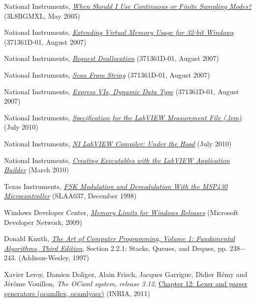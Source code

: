 \documentclass[a4paper]{report}
\begin{document}
\begin{thebibliography}{99}
National Instruments, {\it \href{http://digital.ni.com/public.nsf/allkb/B86AA2D2FDE9A16086256FFC00604202}{When Should I Use Continuous or Finite Sampling Modes?}} (3L8BGMXL, May 2005)

National Instruments, {\it \href{http://zone.ni.com/reference/en-XX/help/371361D-01/lvhowto/enable_lrg_ad_aware/}{Extending Virtual Memory Usage for 32-bit Windows}} (371361D-01, August 2007)

National Instruments, {\it \href{http://zone.ni.com/reference/en-XX/help/371361D-01/glang/request_dealloc/}{Request Deallocation}} (371361D-01, August 2007)

National Instruments, {\it \href{http://zone.ni.com/reference/en-XX/help/371361D-01/glang/scan_from_string/}{Scan From String}} (371361D-01, August 2007)

National Instruments, {\it \href{http://zone.ni.com/reference/en-XX/help/371361D-01/lvconcepts/expressvis/}{Express VIs, Dynamic Data Type}} (371361D-01, August 2007)

National Instruments, {\it \href{http://zone.ni.com/devzone/cda/tut/p/id/4139}{Specification for the LabVIEW Measurement File (.lvm)}} (July 2010)

National Instruments, {\it \href{http://zone.ni.com/devzone/cda/tut/p/id/11472}{NI LabVIEW Compiler: Under the Hood}} (July 2010)

National Instruments, {\it \href{http://zone.ni.com/devzone/cda/tut/p/id/4039}{Creating Executables with the LabVIEW Application Builder}} (March 2010)

Texas Instruments, {\it \href{http://www.ti.com/lit/an/slaa037/slaa037.pdf}{FSK Modulation and Demodulation With the MSP430 Microcontroller}} (SLAA037, December 1998)

Windows Developer Center, {\it \href{http://msdn.microsoft.com/en-us/library/aa366778(VS.85).aspx}{Memory Limits for Windows Releases}} (Microsoft Developer Network, 2009)

Donald Knuth, {\it \href{http://books.google.fr/books?id=MooMkK6ERuYC}{The Art of Computer Programming, Volume 1: Fundamental Algorithms, Third Edition}}, Section 2.2.1: Stacks, Queues, and Deques, pp. 238$-$243. (Addison-Wesley, 1997)

Xavier Leroy, Damien Doligez, Alain Frisch, Jacques Garrigue, Didier R\'emy and J\'er\^ome Vouillon, {\it  The OCaml system, release 3.12}, \href{http://caml.inria.fr/pub/docs/manual-ocaml/manual026.html}{Chapter 12: Lexer and parser generators (ocamllex, ocamlyacc)} (INRIA, 2011)


\end{thebibliography}
\end{document}
